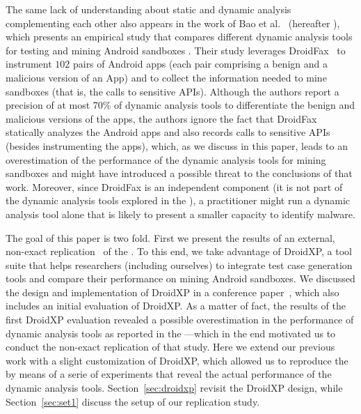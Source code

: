 The same lack of understanding about static and dynamic analysis complementing each other also appears in the work of Bao et al.~\cite{DBLP:conf/wcre/BaoLL18} (hereafter \blls), which presents an empirical study that compares different dynamic analysis tools for testing and mining Android sandboxes%
. Their study leverages DroidFax~\cite{DBLP:conf/icsm/CaiR17a} to instrument $102$ pairs of Android apps (each pair comprising a benign and a malicious version of an App) and to collect the information needed to mine sandboxes (that is, the calls to sensitive APIs).
Although the authors report a precision of at most 70\% of dynamic analysis tools to differentiate the benign and malicious versions of the apps, the authors ignore the fact that DroidFax statically analyzes the Android apps and also records calls to sensitive APIs (besides instrumenting the apps), which, as we discuss in this paper, leads to an overestimation of the performance of the dynamic analysis tools for mining sandboxes and might have introduced a possible threat to the conclusions of that work. Moreover, since DroidFax is an independent component (it is not part of the dynamic analysis tools explored in the \blls), a practitioner might run a dynamic analysis tool alone that is likely to present a smaller capacity to identify malware. 

The goal of this paper is two fold. First we present the results of an
external, non-exact replication~\cite{role-of-replication} of the \blls. To this end,
we take advantage of DroidXP, a tool suite that helps researchers (including ourselves) to
integrate test case generation tools and compare their performance on
mining Android sandboxes. We discussed the design and implementation of DroidXP in a conference
paper~\cite{DBLP:conf/scam/CostaMCMVBC20}, which also
includes an initial evaluation of DroidXP.
As a matter of fact, the results of the first DroidXP evaluation revealed a possible
overestimation in the performance of dynamic analysis tools as
reported in the \blls---which in the end motivated us to
conduct the non-exact replication of that study. Here we extend
our previous work with a slight customization of DroidXP, which allowed us
to reproduce the \blls by means of a serie of experiments
that reveal the actual performance of the
dynamic analysis tools. Section~\ref{sec:droidxp} revisit the
DroidXP design, while Section~\ref{sec:set1} discuss
the setup of our replication study.


